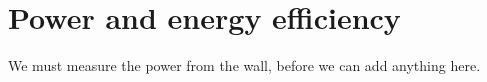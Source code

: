 \section{Power and energy efficiency}

We must measure the power from the wall, before we can add anything here.













